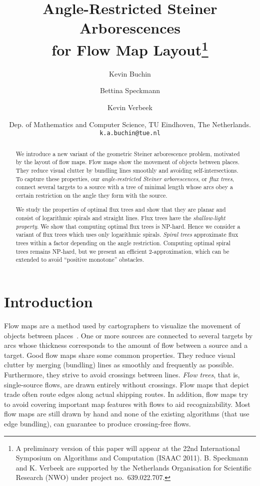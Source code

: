 \documentclass{journalA4}
\title{Angle-Restricted Steiner Arborescences\\ for Flow Map Layout\thanks{A preliminary version of this paper will appear at the 22nd International Symposium on Algorithms and Computation (ISAAC 2011). B. Speckmann and K. Verbeek are supported by the Netherlands Organisation for Scientific Research (NWO) under project no.~639.022.707.}}
\author{Kevin Buchin \and Bettina Speckmann \and Kevin Verbeek}
\date{
Dep. of Mathematics and Computer Science, TU Eindhoven, The Netherlands.\\ {\tt k.a.buchin@tue.nl} \qquad {\tt speckman@win.tue.nl} \qquad {\tt k.a.b.verbeek@tue.nl}
}
\begin{document}
\maketitle

\begin{abstract}
We introduce a new variant of the geometric Steiner arborescence problem, motivated by the layout of flow maps. Flow maps show the movement of objects between places. They reduce visual clutter by bundling lines smoothly and avoiding self-intersections. To capture these properties, our \emph{angle-restricted Steiner arborescences}, or \emph{flux trees}, connect several targets to a source with a tree of minimal length whose arcs obey a certain restriction on the angle they form with the source.

We study the properties of optimal flux trees and show that they are planar and consist of logarithmic spirals and straight lines. Flux trees have the \emph{shallow-light property}. We show that computing optimal flux trees is NP-hard. Hence we consider a variant of flux trees which uses only logarithmic spirals. \emph{Spiral trees} approximate flux trees within a factor depending on the angle restriction. Computing optimal spiral trees remains NP-hard, but we present an efficient 2-approximation, which can be extended to avoid ``positive monotone'' obstacles.
\end{abstract}

\section{Introduction}\label{sec:introduction}

Flow maps are a method used by cartographers to visualize the movement of objects between places~\cite{Dent1999,Slocum2010}. One or more sources are connected to several targets by arcs whose thickness corresponds to the amount of flow between a source and a target. Good flow maps share some common properties. They reduce visual clutter by merging (bundling) lines as smoothly and frequently as possible. Furthermore, they strive to avoid crossings between lines. \emph{Flow trees}, that is, single-source flows, are drawn entirely without crossings. Flow maps that depict trade often route edges along actual shipping routes. In addition, flow maps try to avoid covering important map features with flows to aid recognizability. Most flow maps are still drawn by hand and none of the existing algorithms (that use edge bundling), can guarantee to produce crossing-free flows.
\end{document}
